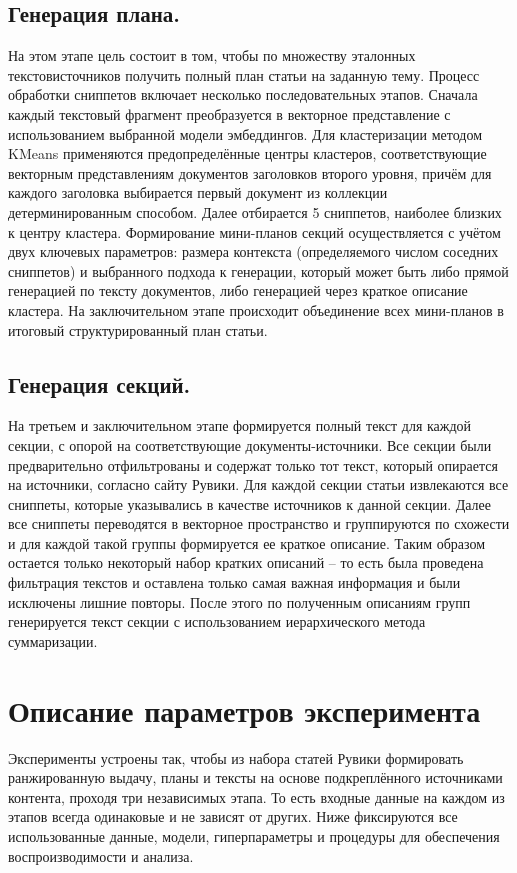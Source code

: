 \documentclass{article}
\theoremstyle{definition}
\theoremstyle{plain}
\begin{document}
\subsection*{Генерация плана.}

На этом этапе цель состоит в том, чтобы по множеству эталонных текстов\-источников получить полный план статьи на заданную тему.
Процесс обработки сниппетов включает несколько последовательных этапов. 
Сначала каждый текстовый фрагмент преобразуется в векторное представление с использованием выбранной модели эмбеддингов. 
Для кластеризации методом KMeans применяются предопределённые центры кластеров, соответствующие векторным представлениям документов заголовков второго уровня, причём для каждого заголовка выбирается первый документ из коллекции детерминированным способом. 
Далее отбирается 5 сниппетов, наиболее близких к центру кластера.  Формирование мини-планов секций осуществляется с учётом двух ключевых параметров: размера контекста (определяемого числом соседних сниппетов) и выбранного подхода к генерации, который может быть либо прямой генерацией по тексту документов, либо генерацией через краткое описание кластера. 
На заключительном этапе происходит объединение всех мини-планов в итоговый структурированный план статьи.

\subsection*{Генерация секций.}
На третьем и заключительном этапе формируется полный текст для каждой секции, с опорой на соответствующие документы-источники.
Все секции были предварительно отфильтрованы и содержат только тот текст, который опирается на источники, согласно сайту Рувики. 
Для каждой секции статьи извлекаются все сниппеты, которые указывались в качестве источников к данной секции. 
Далее все сниппеты переводятся в векторное пространство и группируются по схожести и для каждой такой группы формируется ее краткое описание.
Таким образом остается только некоторый набор кратких описаний – то есть была проведена фильтрация текстов и оставлена только самая важная информация и были исключены лишние повторы. 
После этого по полученным описаниям групп генерируется текст секции с использованием иерархического метода суммаризации.
\section*{Описание параметров эксперимента}

Эксперименты устроены так, чтобы из набора статей Рувики формировать ранжированную выдачу, планы и тексты на основе подкреплённого источниками контента, проходя три независимых этапа.
То есть входные данные на каждом из этапов всегда одинаковые и не зависят от других.
Ниже фиксируются все использованные данные, модели, гиперпараметры и процедуры для обеспечения воспроизводимости и анализа.
\end{document}
